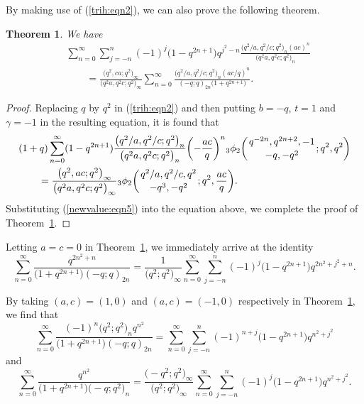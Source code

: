 \documentclass[pdftex]{sigma}
\numberwithin{equation}{section}
\newtheorem{Theorem}{Theorem}[section]
\begin{document}
By making use of (\ref{trih:eqn2}), we can also prove the following theorem.
\begin{Theorem}\label{mortrianHecke} We have
\begin{align*}%
&\sum_{n=0}^\infty \sum_{j=-n}^n (-1)^j \bigl(1-q^{2n+1}\bigr)q^{j^2-n} \frac{\bigl(q^2/a, q^2/c; q^2\bigr)_n (ac)^n}{\bigl(q^2 a, q^2 c; q^2\bigr)_n}\\
&\qquad{}=\frac{\bigl(q^2, ca; q^2\bigr)_\infty}{\bigl(q^2 a, q^2 c; q^2\bigr)_\infty}
\sum_{n=0}^\infty \frac{\bigl(q^2/a, q^2/c; q^2\bigr)_n (ac/q)^n}{(-q; q)_{2n} \bigl(1+q^{2n+1}\bigr)}.\nonumber
\end{align*}	
\end{Theorem}
\begin{proof} Replacing $q$ by $q^2$ in (\ref{trih:eqn2}) and then putting $b=-q$, $t=1$ and $\gamma=-1$ in the resulting equation, it is found that
\begin{align*}
	&(1+q)\sum_{n=0}^\infty(1-q^{2n+1}) \frac{\bigl(q^2/a, q^2/c; q^2\bigr)_n}{\bigl(q^2a, q^2 c; q^2\bigr)_n} \biggl(-\frac{ac}{q}\biggr)^n {_3\phi_2}\biggl({{q^{-2n}, q^{2n+2}, -1}\atop{-q, -q^2}}; q^2, q^2\biggr)\\
	&\qquad{}=\frac{\bigl(q^2, ac; q^2\bigr)_\infty}{\bigl(q^2a, q^2c; q^2\bigr)_\infty}
	{_3\phi_2}\biggl({{q^2/a, q^2/c, q^2}\atop{-q^3, {-q^2}}}; q^2, \frac{ac}{q}\biggr).\nonumber
\end{align*}		
Substituting (\ref{newvalue:eqn5}) into the equation above, we complete the proof of Theorem~\ref{mortrianHecke}.
\end{proof}

Letting $a=c=0$ in Theorem~\ref{mortrianHecke}, we immediately arrive at the identity
\begin{equation*}%
	\sum_{n=0}^\infty \frac{q^{2n^2+n}}{\bigl(1+q^{2n+1}\bigr) (-q; q)_{2n}}
	=\frac{1}{\bigl(q^2; q^2\bigr)_\infty}\sum_{n=0}^\infty \sum_{j=-n}^n (-1)^j
	\bigl(1-q^{2n+1}\bigr)q^{2n^2+j^2+n}.
\end{equation*}

By taking $(a, c)=(1, 0)$ and $(a, c)=(-1, 0)$ respectively in Theorem~\ref{mortrianHecke}, we find that
\begin{equation*}%
	\sum_{n=0}^\infty \frac{(-1)^n \bigl(q^2; q^2\bigr)_n q^{n^2}}{\bigl(1+q^{2n+1}\bigr) (-q; q)_{2n}}
	=\sum_{n=0}^\infty \sum_{j=-n}^n (-1)^{n+j}
	\bigl(1-q^{2n+1}\bigr)q^{n^2+j^2}
\end{equation*}
and
\begin{equation*}%
	\sum_{n=0}^\infty \frac{ q^{n^2}}{\bigl(1+q^{2n+1}\bigr) \bigl(-q; q^2\bigr)_{n}}
	=\frac{\bigl(-q^2; q^2\bigr)_\infty}{\bigl(q^2; q^2\bigr)_\infty}\sum_{n=0}^\infty \sum_{j=-n}^n (-1)^{j}
	\bigl(1-q^{2n+1}\bigr)q^{n^2+j^2}.
	\end{equation*}
\end{document}
